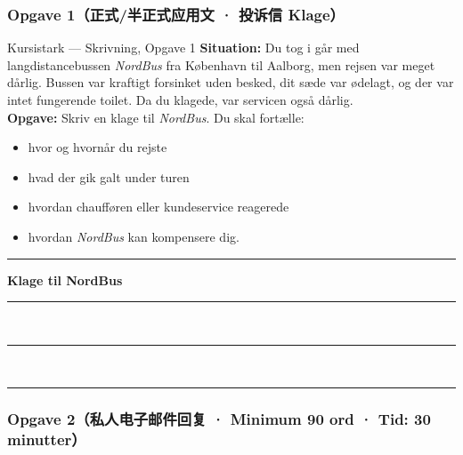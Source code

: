 \clearpage
{}

\subsubsection*{Opgave 1（正式/半正式应用文 · 投诉信 Klage）}

\begin{emailbox}{Kursistark --- Skrivning, Opgave 1}
\textbf{Situation:} Du tog i går med langdistancebussen \textit{NordBus} fra København til Aalborg, men rejsen var meget dårlig. Bussen var kraftigt forsinket uden besked, dit sæde var ødelagt, og der var intet fungerende toilet. Da du klagede, var servicen også dårlig.\\
\textbf{Opgave:} Skriv en klage til \textit{NordBus}. Du skal fortælle:
\begin{itemize}[itemsep=0.05em, topsep=0.08em, parsep=0pt]
  \item hvor og hvornår du rejste
  \item hvad der gik galt under turen
  \item hvordan chaufføren eller kundeservice reagerede
  \item hvordan \textit{NordBus} kan kompensere dig.
\end{itemize}

\vspace{0.15em}
\hrule
\vspace{0.15em}
\textbf{Klage til NordBus}\\[2pt]
\rule{\linewidth}{0.4pt}\\[2pt]
\rule{\linewidth}{0.4pt}\\[2pt]
\rule{\linewidth}{0.4pt}
\end{emailbox}

\subsubsection*{Opgave 2（私人电子邮件回复 · Minimum 90 ord · Tid: 30 minutter）}

